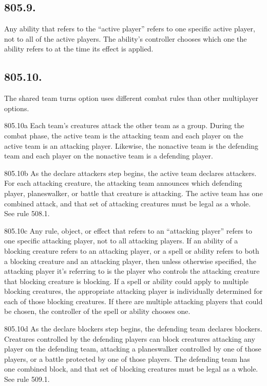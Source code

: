 \subsection*{805.9.}
Any ability that refers to the “active player” refers to one specific active player, not to all of the active players. The ability’s controller chooses which one the ability refers to at the time its effect is applied.

\subsection*{805.10.}
The shared team turns option uses different combat rules than other multiplayer options.

805.10a Each team’s creatures attack the other team as a group. During the combat phase, the active team is the attacking team and each player on the active team is an attacking player. Likewise, the nonactive team is the defending team and each player on the nonactive team is a defending player.

805.10b As the declare attackers step begins, the active team declares attackers. For each attacking creature, the attacking team announces which defending player, planeswalker, or battle that creature is attacking. The active team has one combined attack, and that set of attacking creatures must be legal as a whole. See rule 508.1.

805.10c Any rule, object, or effect that refers to an “attacking player” refers to one specific attacking player, not to all attacking players. If an ability of a blocking creature refers to an attacking player, or a spell or ability refers to both a blocking creature and an attacking player, then unless otherwise specified, the attacking player it’s referring to is the player who controls the attacking creature that blocking creature is blocking. If a spell or ability could apply to multiple blocking creatures, the appropriate attacking player is individually determined for each of those blocking creatures. If there are multiple attacking players that could be chosen, the controller of the spell or ability chooses one.

805.10d As the declare blockers step begins, the defending team declares blockers. Creatures controlled by the defending players can block creatures attacking any player on the defending team, attacking a planeswalker controlled by one of those players, or a battle protected by one of those players. The defending team has one combined block, and that set of blocking creatures must be legal as a whole. See rule 509.1.

